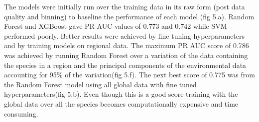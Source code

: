 \documentclass{article}
\begin{document}
The models were initially run over the training data in its raw form (post data quality and binning) to baseline the performance of each model (fig 5.a). Random Forest and XGBoost gave PR AUC values of 0.773 and 0.742 while SVM performed poorly. Better results were achieved by fine tuning hyperparameters and by training models on regional data. The maximum PR AUC score of 0.786 was achieved by running Random Forest over a variation of the data containing the species in a region and the principal components of the environmental data accounting for 95\% of the variation(fig 5.f). The next best score of 0.775 was from the Random Forest model using all global data with fine tuned hyperparameters(fig 5.b). Even though this is a good score training with the global data over all the species becomes computationally expensive and time consuming.
\end{document}
